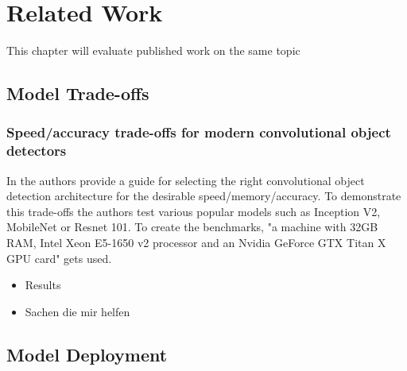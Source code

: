\chapter{Related Work}
This chapter will evaluate published work on the same topic
\section{Model Trade-offs}
\subsection{Speed/accuracy trade-offs for modern convolutional object detectors}
In \cite{DBLP:journals/corr/HuangRSZKFFWSG016} the authors provide a guide for selecting the right convolutional object detection architecture for the desirable speed/memory/accuracy. To demonstrate this trade-offs the authors test various popular models such as Inception V2, MobileNet or Resnet 101. To create the benchmarks, "a machine with 32GB RAM,
Intel Xeon E5-1650 v2 processor and an Nvidia GeForce
GTX Titan X GPU card"\cite{DBLP:journals/corr/HuangRSZKFFWSG016} gets used.

\begin{itemize}
    \item Results
    \item Sachen die mir helfen
\end{itemize}

\section{Model Deployment}
\cite{DBLP:conf/mmsys/2018}
\cite{DBLP:conf/ic2e/2018}
 \endinput 
